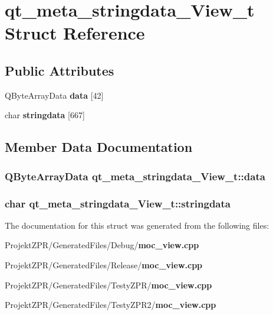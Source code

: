 \section{qt\-\_\-meta\-\_\-stringdata\-\_\-\-View\-\_\-t Struct Reference}
\label{structqt__meta__stringdata___view__t}
\subsection*{Public Attributes}
\begin{DoxyCompactItemize}
\item 
Q\-Byte\-Array\-Data {\bf data} [42]
\item 
char {\bf stringdata} [667]
\end{DoxyCompactItemize}


\subsection{Member Data Documentation}
\subsubsection[{data}]{\setlength{\rightskip}{0pt plus 5cm}Q\-Byte\-Array\-Data qt\-\_\-meta\-\_\-stringdata\-\_\-\-View\-\_\-t\-::data}\label{structqt__meta__stringdata___view__t_a37b74396a22dc946220b5d3ac1a6546d}
\subsubsection[{stringdata}]{\setlength{\rightskip}{0pt plus 5cm}char qt\-\_\-meta\-\_\-stringdata\-\_\-\-View\-\_\-t\-::stringdata}\label{structqt__meta__stringdata___view__t_aa97b67573d1d28bf88f803a713abdd66}


The documentation for this struct was generated from the following files\-:\begin{DoxyCompactItemize}
\item 
Projekt\-Z\-P\-R/\-Generated\-Files/\-Debug/{\bf moc\-\_\-view.\-cpp}\item 
Projekt\-Z\-P\-R/\-Generated\-Files/\-Release/{\bf moc\-\_\-view.\-cpp}\item 
Projekt\-Z\-P\-R/\-Generated\-Files/\-Testy\-Z\-P\-R/{\bf moc\-\_\-view.\-cpp}\item 
Projekt\-Z\-P\-R/\-Generated\-Files/\-Testy\-Z\-P\-R2/{\bf moc\-\_\-view.\-cpp}\end{DoxyCompactItemize}
